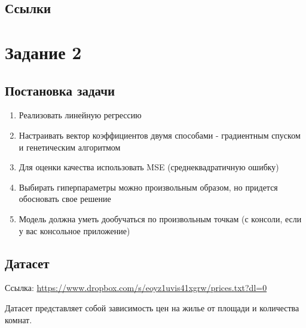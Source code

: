 \documentclass[a4paper, unicode]{article}
\begin{document}
\subsection{Ссылки}
\label{sec:orgheadline5}

\section{Задание 2}
\label{sec:orgheadline12}
\subsection{Постановка задачи}
\label{sec:orgheadline7}
\begin{enumerate}
\item Реализовать линейную регрессию
\item Настраивать вектор коэффициентов двумя способами - градиентным спуском и
генетическим алгоритмом
\item Для оценки качества использовать MSE (среднеквадратичную ошибку)
\item Выбирать гиперпараметры можно произвольным образом, но придется обосновать
свое решение
\item Модель должна уметь дообучаться по произвольным точкам (с консоли, если у вас
консольное приложение)
\end{enumerate}
\subsection{Датасет}
\label{sec:orgheadline8}
Ссылка: \url{https://www.dropbox.com/s/eoyz1uvis41xgrw/prices.txt?dl=0}

Датасет представляет собой зависимость цен на жилье от площади и количества
комнат.
\end{document}
